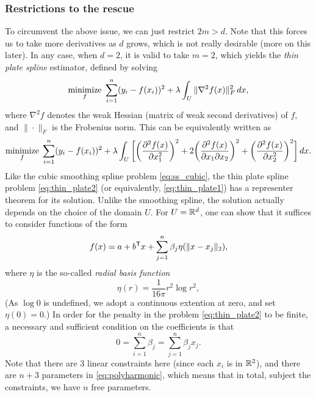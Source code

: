 \documentclass{article}
\begin{document}
\subsubsection{Restrictions to the rescue}

To circumvent the above issue, we can just restrict $2m > d$. Note that this
forces us to take more derivatives as $d$ grows, which is not really desirable
(more on this later). In any case, when $d=2$, it is valid to take $m=2$, which
yields the \emph{thin plate spline} estimator, defined by solving   
\begin{equation}
\label{eq:thin_plate1}
\mathop{\mathrm{minimize}}_f \; \sum_{i=1}^n (y_i - f(x_i))^2 + \lambda \int_U \|\nabla^2 
f(x)\|_F^2 \, dx, 
\end{equation}
where $\nabla^2 f$ denotes the weak Hessian (matrix of weak second derivatives)
of $f$, and $\|\cdot\|_F$ is the Frobenius norm. This can be equivalently
written as  
\begin{equation}
\label{eq:thin_plate2}
\mathop{\mathrm{minimize}}_f \; \sum_{i=1}^n (y_i - f(x_i))^2 + \lambda \int_U \bigg[ \bigg( 
\frac{\partial^2 f(x)}{\partial x_1^2}\bigg)^2 +  2\bigg( \frac{\partial^2
  f(x)}{\partial x_1 \partial x_2} \bigg)^2 +  \bigg( \frac{\partial^2
  f(x)}{\partial x_2^2} \bigg)^2 \bigg] \, dx. 
\end{equation}
Like the cubic smoothing spline problem \eqref{eq:ss_cubic}, the thin plate
spline problem \eqref{eq:thin_plate2} (or equivalently, \eqref{eq:thin_plate1}) 
has a representer theorem for its solution. Unlike the smoothing spline, the
solution actually depends on the choice of the domain $U$. For $U = \mathbb{R}^d$,  
one can show that it suffices to consider functions of the form   
\begin{equation} 
\label{eq:polyharmonic}
f(x) = a + b^{\mathsf{T}} x + \sum_{j=1}^n \beta_j \eta(\|x - x_j\|_2), 
\end{equation}
where $\eta$ is the so-called \emph{radial basis function}
\[
\eta(r) = \frac{1}{16 \pi} r^2 \log r^2,
\]
(As $\log 0$ is undefined, we adopt a continuous extention at zero, and set
$\eta(0) = 0$.) In order for the penalty in the problem \eqref{eq:thin_plate2}
to be finite, a necessary and sufficient condition on the coefficients is that 
\[
0 = \sum_{i=1}^n \beta_j = \sum_{j=1}^n \beta_j x_j.
\]
Note that there are 3 linear constraints here (since each $x_i$ is in $\mathbb{R}^2$), 
and there are $n+3$ parameters in \eqref{eq:polyharmonic}, which means that in
total, subject the constraints, we have $n$ free parameters.  
\end{document}
